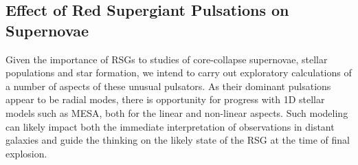 \subsection{Effect of Red Supergiant Pulsations on Supernovae}

Given the importance of RSGs to studies of core-collapse supernovae, stellar populations and star formation, we intend to carry out exploratory calculations of a number of aspects of these unusual pulsators. As their dominant pulsations appear to be radial modes, there is opportunity for progress with 1D stellar models such as MESA, both for the linear and non-linear aspects. {\color{green} Such modeling can likely impact both the immediate interpretation of observations in distant galaxies and guide the thinking on the likely state of the RSG at the time of final explosion.}